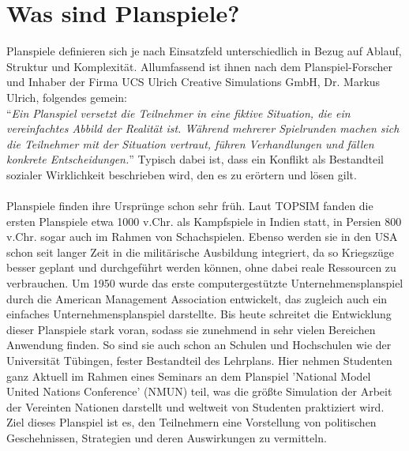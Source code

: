 \section{Was sind Planspiele?}
\label{sec:einleitung-was}

Planspiele definieren sich je nach Einsatzfeld unterschiedlich in Bezug auf Ablauf, Struktur und Komplexität. Allumfassend ist ihnen nach dem Planspiel-Forscher und Inhaber der Firma UCS Ulrich Creative Simulations GmbH, Dr. Markus Ulrich, folgendes gemein:
\\
"`\textit{Ein Planspiel versetzt die Teilnehmer in eine fiktive Situation, die ein vereinfachtes Abbild der Realität ist. Während mehrerer Spielrunden machen sich die Teilnehmer mit der Situation vertraut, führen Verhandlungen und fällen konkrete Entscheidungen.}"' Typisch dabei ist, dass ein Konflikt als Bestandteil sozialer Wirklichkeit beschrieben wird, den es zu erörtern und lösen gilt.
\\
\\
Planspiele finden ihre Ursprünge schon sehr früh. Laut TOPSIM fanden die ersten Planspiele etwa 1000 v.Chr. als Kampfspiele in Indien statt, in Persien 800 v.Chr. sogar auch im Rahmen von Schachspielen.  Ebenso werden sie in den USA schon seit langer Zeit in die militärische Ausbildung integriert, da so Kriegszüge besser geplant und durchgeführt werden können, ohne dabei reale Ressourcen zu verbrauchen. Um 1950 wurde das  erste computergestützte Unternehmensplanspiel durch die American Management Association entwickelt, das zugleich auch ein einfaches Unternehmensplanspiel darstellte. Bis heute schreitet die Entwicklung dieser Planspiele stark voran, sodass sie zunehmend in sehr vielen Bereichen Anwendung finden. So sind sie auch schon an Schulen und Hochschulen wie der Universität Tübingen, fester Bestandteil des Lehrplans. Hier nehmen Studenten ganz Aktuell im Rahmen eines Seminars an dem Planspiel 'National Model United Nations Conference' (NMUN) teil, was die größte Simulation der Arbeit der Vereinten Nationen darstellt und weltweit von Studenten praktiziert wird. Ziel dieses Planspiel ist es, den Teilnehmern eine Vorstellung von politischen Geschehnissen, Strategien und deren Auswirkungen zu vermitteln.
\\
\\
